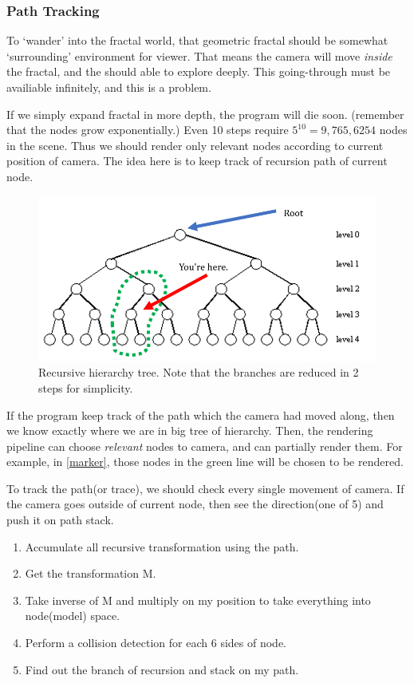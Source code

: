 \documentclass[a4paper]{article}
\begin{document}
\subsubsection{Path Tracking}\label{sssec:num1}
To `wander' into the fractal world, that geometric fractal should be somewhat `surrounding' environment for viewer.
That means the camera will move \textit{inside} the fractal, and the should able to explore deeply.
This going-through must be availiable infinitely, and this is a problem.

If we simply expand fractal in more depth, the program will die soon. (remember that the nodes grow exponentially.)
Even 10 steps require $5^{10}=9,765,6254$ nodes in the scene.
Thus we should render only relevant nodes according to current position of camera.
The idea here is to keep track of recursion path of current node.

\begin{figure}[H]
\centering
\includegraphics[scale=0.5]{tree.png}
\caption[q]{Recursive hierarchy tree. Note that the branches are reduced in 2 steps for simplicity.}
\label{fig:tree}
\end{figure}

If the program keep track of the path which the camera had moved along, then we know exactly where we are in big tree of hierarchy.
Then, the rendering pipeline can choose \textit{relevant} nodes to camera, and can partially render them.
For example, in \ref{marker}, those nodes in the green line will be chosen to be rendered.

To track the path(or trace), we should check every single movement of camera.
If the camera goes outside of current node, then see the direction(one of 5) and push it on path stack.
\begin{enumerate}
  \item Accumulate all recursive transformation using the path.
  \item Get the transformation M.
  \item Take inverse of M and multiply on my position to take everything into node(model) space.
  \item Perform a collision detection for each 6 sides of node.
  \item Find out the branch of recursion and stack on my path.
\end{enumerate}
\end{document}
